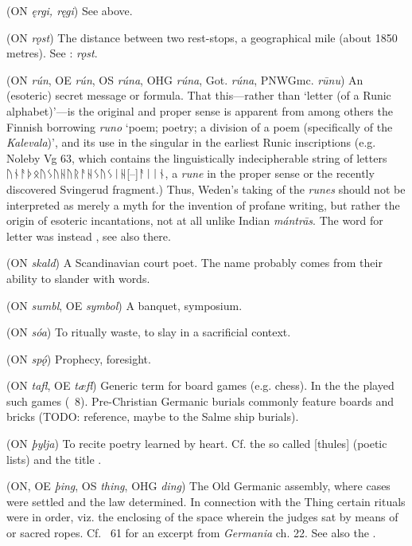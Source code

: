 \begin{itemize}
 (ON \emph{ęrgi, ręgi})
  See  above.

 (ON \emph{rǫst})
  The distance between two rest-stops, a geographical mile (about 1850 metres).  See \CV: \emph{rǫst}.

 (ON \emph{rún}, OE \emph{rún}, OS \emph{rúna}, OHG \emph{rúna}, Got. \emph{rúna}, PNWGmc. \emph{rūnu})
  An (esoteric) secret message or formula. That this—rather than ‘letter (of a Runic alphabet)’—is the original and proper sense is apparent from among others the Finnish borrowing \emph{runo} ‘poem; poetry; a division of a poem (specifically of the \emph{Kalevala})’, and its use in the singular in the earliest Runic inscriptions (e.g. Noleby Vg 63, which contains the linguistically indecipherable string of letters {ᚢᚾᚨᚦᛟᚢᛊᚢᚺᚢᚱᚨᚺᛊᚢᛊᛁᚺ[--]ᚨᛁᛁᚾ}, a \emph{rune} in the proper sense or the recently discovered Svingerud fragment.) Thus, Weden’s taking of the \emph{runes} should not be interpreted as merely a myth for the invention of profane writing, but rather the origin of esoteric incantations, not at all unlike Indian \emph{mántrās}.
  The word for letter was instead , see also there.

 (ON \emph{skald})
  A Scandinavian court poet.  The name probably comes from their ability to slander with words.

 (ON \emph{sumbl}, OE \emph{symbol})
  A banquet, symposium.

 (ON \emph{sóa})
  To ritually waste, to slay in a sacrificial context.

 (ON \emph{spǫ́})
  Prophecy, foresight.

 (ON \emph{tafl}, OE \emph{tæfl})
  Generic term for board games (e.g. chess).  In the  the  played such games (\Voluspa\ 8).  Pre-Christian Germanic burials commonly feature boards and bricks (TODO: reference, maybe to the Salme ship burials).

 (ON \emph{þylja})
  To recite poetry learned by heart.  Cf. the so called [thules] (poetic lists) and the title .

 (ON, OE \emph{þing}, OS \emph{thing}, OHG \emph{ding})
  The Old Germanic assembly, where cases were settled and the law determined.  In connection with the Thing certain rituals were in order, viz. the enclosing of the space wherein the judges sat by means of  or sacred ropes.  Cf. \Havamal\ 61 for an excerpt from \emph{Germania} ch. 22.  See also the .


\end{itemize}
